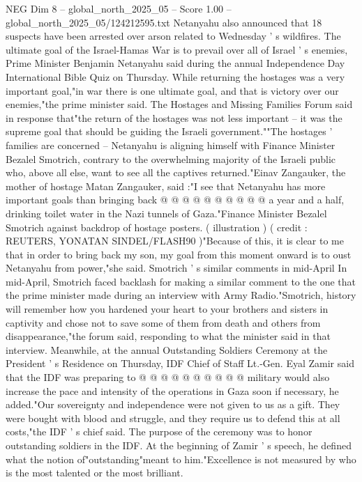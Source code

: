 \begin{textsample}{NEG Dim 8 – global\_north\_2025\_05 – Score 1.00 – global\_north\_2025\_05/124212595.txt}  \label{ex:f8_neg_414}
Netanyahu also announced that 18 suspects have been arrested over arson related to Wednesday ' s wildfires.
The ultimate goal of the Israel-Hamas War is to prevail over all of Israel ' s enemies, Prime Minister Benjamin Netanyahu said during the annual Independence Day International Bible Quiz on Thursday.
While returning the hostages was a very important goal,"in war there is one ultimate goal, and that is victory over our enemies,"the prime minister said.
The Hostages and Missing Families Forum said in response that"the return of the hostages was not less important -- it was the supreme goal that should be guiding the Israeli government.""The hostages ' families are concerned -- Netanyahu is aligning himself with Finance Minister Bezalel Smotrich, contrary to the overwhelming majority of the Israeli public who, above all else, want to see all the captives returned."Einav Zangauker, the mother of hostage Matan Zangauker, said :"I see that Netanyahu has more important goals than bringing back @ @ @ @ @ @ @ @ @ @ a year and a half, drinking toilet water in the Nazi tunnels of Gaza."Finance Minister Bezalel Smotrich against backdrop of hostage posters. ( illustration ) ( credit : REUTERS, YONATAN SINDEL/FLASH90 )"Because of this, it is clear to me that in order to bring back my son, my goal from this moment onward is to oust Netanyahu from power,"she said.
Smotrich ' s similar comments in mid-April In mid-April, Smotrich faced backlash for making a similar comment to the one that the prime minister made during an interview with Army Radio."Smotrich, history will remember how you hardened your heart to your brothers and sisters in captivity and chose not to save some of them from death and others from disappearance,"the forum said, responding to what the minister said in that interview.
Meanwhile, at the annual Outstanding Soldiers Ceremony at the President ' s Residence on Thursday, IDF Chief of Staff Lt.-Gen.
Eyal Zamir said that the IDF was preparing to @ @ @ @ @ @ @ @ @ @ military would also increase the pace and intensity of the operations in Gaza soon if necessary, he added."Our sovereignty and independence were not given to us as a gift.
They were bought with blood and struggle, and they require us to defend this at all costs,"the IDF ' s chief said.
The purpose of the ceremony was to honor outstanding soldiers in the IDF.
At the beginning of Zamir ' s speech, he defined what the notion of"outstanding"meant to him."Excellence is not measured by who is the most talented or the most brilliant.

\end{textsample}
